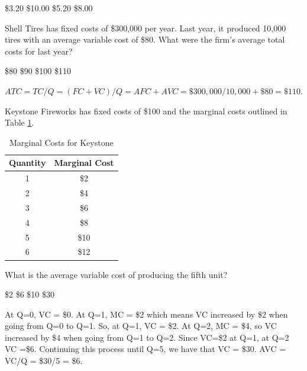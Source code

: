 \documentclass[addpoints,11pt]{exam}
\theoremstyle{definition}
\begin{document}
\begin{questions}
\begin{choices}
	\choice \$3.20
	\CorrectChoice \$10.00
	\choice \$5.20
	\choice \$8.00
\end{choices}
			
			\question Shell Tires has fixed costs of \$300,000 per year. Last year, it produced 10,000 tires with an average variable cost of \$80. What were the firm's average total costs for last year?
			
			\begin{choices}
				\choice \$80
				\choice \$90
				\choice \$100
				\CorrectChoice \$110
			\end{choices}
			
			\begin{solution}
				$ATC = TC/Q = (FC + VC)/Q = AFC + AVC = \$300,000/10,000 + \$80 = \$110$.
			\end{solution}
			
			\question Keystone Fireworks has fixed costs of \$100 and the marginal costs outlined in Table \ref{tab1}.
			
			\begin{table}[H]
				\caption{Marginal Costs for Keystone}
				\label{tab1}
				\centering
				\begin{tabular}{ c|c}      
					Quantity & Marginal Cost\\     
					\hline
					1 & \$2   \\
					2 & \$4   \\
					3 & \$6  \\
					4 & \$8   \\
					5 & \$10  \\
					6 & \$12  \\
				\end{tabular}
			\end{table}
			
			What is the average variable cost of producing the fifth unit?
			
			\begin{choices}
				\choice \$2
				\CorrectChoice \$6
				\choice \$10
				\choice \$30
			\end{choices}
			
			\begin{solution}
				At Q=0, VC = \$0. At Q=1, MC = \$2 which means VC increased by \$2 when going from Q=0 to Q=1. So, at Q=1, VC = \$2. At Q=2, MC = \$4, so VC increased by \$4 when going from Q=1 to Q=2. Since VC=\$2 at Q=1, at Q=2 VC =\$6. Continuing this process until Q=5, we have that VC = \$30. AVC = VC/Q = \$30/5 = \$6.
				

\end{solution}
\end{questions}
\end{document}
